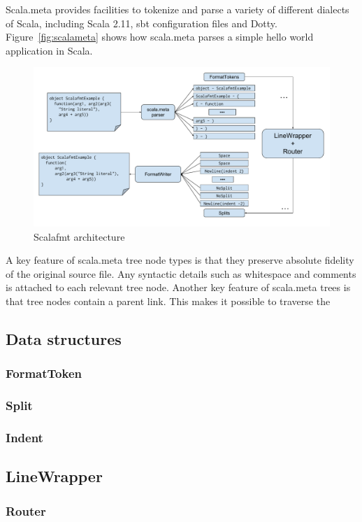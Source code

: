 Scala.meta provides facilities to tokenize and parse a variety of different dialects of Scala, including Scala 2.11, sbt configuration files and Dotty.
Figure~\ref{fig:scalameta} shows how scala.meta parses a simple hello world application in Scala.
\begin{figure}
  \centering
  \includegraphics[width=\textwidth]{img/architechture.pdf}
  \caption{Scalafmt architecture}
  \label{fig:architecture}
\end{figure}

A key feature of scala.meta tree node types is that they preserve absolute fidelity of the original source file.
Any syntactic details such as whitespace and comments is attached to each relevant tree node.
Another key feature of scala.meta trees is that tree nodes contain a parent link.
This makes it possible to traverse the 



\subsection{Data structures}
\subsubsection{FormatToken}
\subsubsection{Split}
\subsubsection{Indent}
\subsection{LineWrapper}
\subsubsection{Router}
